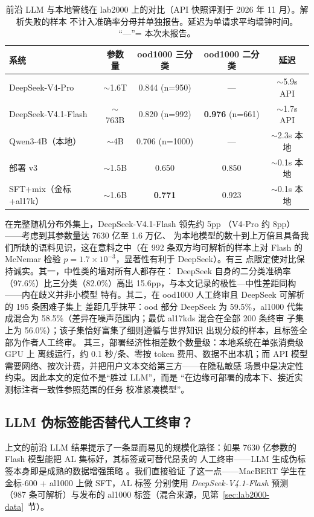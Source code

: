 \documentclass[11pt,a4paper]{article}
\begin{document}
\begin{table}[H]
\centering\small
\caption{前沿 LLM 与本地管线在 lab2000 上的对比（API 快照评测于
2026 年 11 月）。解析失败的样本
不计入准确率分母并单独报告。延迟为单请求平均墙钟时间。
“---”= 本次未报告。}
\label{tab:llm}
\begin{tabular}{lcccc}
\toprule
系统 & 参数量 & ood1000 三分类 & ood1000 二分类 & 延迟 \\
\midrule
DeepSeek-V4-Pro     & $\sim$1.6T     & 0.844 (n=950) & --- & $\sim$5.9s API \\
DeepSeek-V4.1-Flash & $\sim$763B    & 0.820 (n=992) & \textbf{0.976} (n=661) & $\sim$1.7s API \\
Qwen3-4B（本地）     & $\sim$4B      & 0.706 (n=1000) & --- & $\sim$2.3s 本地 \\
部署 v3             & $\sim$1.5B    & 0.650 & 0.850 & $\sim$0.1s 本地 \\
SFT+mix（金标+al17k）& $\sim$1.6B    & \textbf{0.771} & 0.923 & $\sim$0.1s 本地 \\
\bottomrule
\end{tabular}
\end{table}

在完整随机分布外集上，DeepSeek-V4.1-Flash 领先约 5pp
（V4-Pro 约 8pp）——考虑到其参数量达 7630 亿至 1.6 万亿、
为本地模型的数十到上万倍且具备我们所缺的语料见识，这在意料之中（在
992 条双方均可解析的样本上对 Flash 的 McNemar 检验
$p = 1.7\times10^{-3}$，显著性有利于 DeepSeek）。有三
点限定使对比保持诚实。其一，中性类的墙对所有人都存在：
DeepSeek 自身的二分类准确率（97.6\%）比三分类（82.0\%）高出
15.6pp，与本文记录的极性—中性差距同构——内在歧义并非小模型
特有。其二，在 ood1000 人工终审且 DeepSeek 可解析的 195 条困难子集上
差距几乎抹平：ood 部分 DeepSeek 为 59.5\%，al1000 代集成混合为
58.5\%（差异在噪声范围内；最优 al17kds 混合在全部 200 条终审
子集上为 56.0\%）；该子集恰好富集了细则遵循与世界知识
出现分歧的样本，且标签全部为作者人工终审。
其三，部署经济性相差数个数量级：本地系统在单张消费级 GPU 上
离线运行，约 0.1 秒/条、零按 token 费用、数据不出本机；而 API
模型需要网络、按次计费，并把用户文本交给第三方——在隐私敏感
场景中是决定性约束。因此本文的定位不是“胜过 LLM”，而是
“在边缘可部署的成本下、接近实测标注者一致性参照范围的任务
校准紧凑模型”。

\subsection{LLM 伪标签能否替代人工终审？}
\label{sec:ds-teacher}

上文的前沿 LLM 结果提示了一条显而易见的规模化路径：如果
7630 亿参数的 Flash 模型能把 AL 集标好，其标签或可替代昂贵的
人工终审——LLM 生成伪标签本身即是成熟的数据增强策略
\citep{zenimoto2024,neveditsin2025}。我们直接验证
了这一点——MacBERT 学生在金标-600 + al1000 上做 SFT，AL 标签
分别使用 \emph{DeepSeek-V4.1-Flash} 预测（987 条可解析）与发布的
al1000 标签（混合来源，见第~\ref{sec:lab2000-data}~节）。
\end{document}
